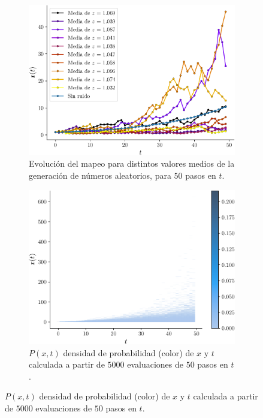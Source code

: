 \documentclass[twocolumn,aps,prl]{revtex4-1}
\newcommand{\nSimulacionesB}{5000}
\newcommand{\Nsteps}{50}
\begin{document}
\begin{figure}[ht!]
  \centering
  \begin{subfigure}[b]{0.49\linewidth}
    \centering
    \includegraphics[width = 0.999\textwidth]{figuras/ex02-mapeo-02.pdf}
    \caption{Evolución del mapeo para distintos valores medios de la generación de números aleatorios, para $\Nsteps$ pasos en $t$.}
    \label{fig:figuras/ex02-mapeo-02}
  \end{subfigure}
  \begin{subfigure}[b]{0.49\linewidth}
    \centering
    \includegraphics[width = 0.999\textwidth]{figuras/ex02-histograma-02.pdf}
    \caption{$P(x,t)$ densidad de probabilidad (color) de $x$ y $t$ calculada a partir de $\nSimulacionesB$ evaluaciones de $\Nsteps$ pasos en $t$.}
    \label{fig:figuras/ex02-histograma-02}
  \end{subfigure}  
\end{figure}
\end{document}
